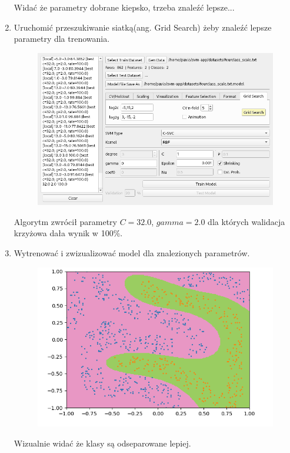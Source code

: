 \documentclass[paper=a4, fontsize=11pt]{scrartcl} %
\numberwithin{equation}{section} %
\numberwithin{figure}{section} %
\begin{document}
\begin{enumerate}[label={\textbf{Krok \theenumi :}},leftmargin=*]
        \par Widać że parametry dobrane kiepsko, trzeba znaleźć lepsze...

        \newpage
        \item Uruchomić przeszukiwanie siatką(ang. Grid Search) żeby znaleźć lepsze parametry
            dla trenowania.

        \begin{figure}[H]
            \begin{center}
                \includegraphics[scale=2.3]{./img/ex4_st3.png}
            \end{center}
        \end{figure}

        Algorytm zwrócił parametry $C=32.0$, $gamma=2.0$ dla których walidacja krzyżowa dała
        wynik w 100\%.

    \item Wytrenować i zwizualizować model dla znalezionych parametrów.

        \begin{figure}[H]
            \begin{center}
                \includegraphics[scale=2.3]{./img/ex4_st4.png}
            \end{center}
        \end{figure}

        \par Wizualnie widać że klasy są odseparowane lepiej.

    \end{enumerate}
    
\end{document}
